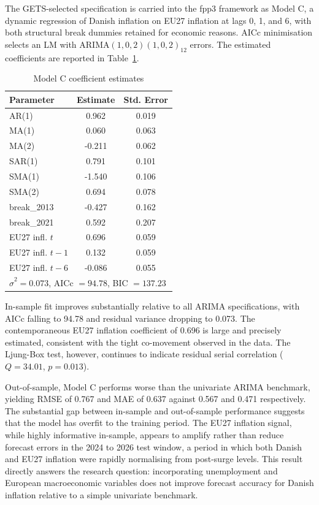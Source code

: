 The GETS-selected specification is carried into the fpp3 framework as Model C, 
a dynamic regression of Danish inflation on EU27 inflation at lags 0, 1, and 6, 
with both structural break dummies retained for economic reasons. AICc 
minimisation selects an LM with ARIMA$(1,0,2)(1,0,2)_{12}$ errors. The 
estimated coefficients are reported in Table~\ref{tab:modelC_coef}.

\begin{table}[H]
\centering
\caption{Model C coefficient estimates}
\begin{tabular}{lcc}
\hline
Parameter & Estimate & Std. Error \\
\hline
AR(1)         &  0.962 & 0.019 \\
MA(1)         &  0.060 & 0.063 \\
MA(2)         & -0.211 & 0.062 \\
SAR(1)        &  0.791 & 0.101 \\
SMA(1)        & -1.540 & 0.106 \\
SMA(2)        &  0.694 & 0.078 \\
break\_2013   & -0.427 & 0.162 \\
break\_2021   &  0.592 & 0.207 \\
EU27 infl. $t$     &  0.696 & 0.059 \\
EU27 infl. $t-1$   &  0.132 & 0.059 \\
EU27 infl. $t-6$   & -0.086 & 0.055 \\
\hline
\multicolumn{3}{l}{$\hat{\sigma}^2 = 0.073$, AICc $= 94.78$, BIC $= 137.23$} \\
\hline
\end{tabular}
\label{tab:modelC_coef}
\end{table}

In-sample fit improves substantially relative to all ARIMA specifications, with 
AICc falling to 94.78 and residual variance dropping to 0.073. The contemporaneous 
EU27 inflation coefficient of 0.696 is large and precisely estimated, consistent 
with the tight co-movement observed in the data. The Ljung-Box test, however, 
continues to indicate residual serial correlation ($Q = 34.01$, $p = 0.013$).

Out-of-sample, Model C performs worse than the univariate ARIMA benchmark, 
yielding RMSE of 0.767 and MAE of 0.637 against 0.567 and 0.471 respectively. 
The substantial gap between in-sample and out-of-sample performance suggests 
that the model has overfit to the training period. The EU27 inflation signal, 
while highly informative in-sample, appears to amplify rather than reduce 
forecast errors in the 2024 to 2026 test window, a period in which both 
Danish and EU27 inflation were rapidly normalising from post-surge levels. 
This result directly answers the research question: incorporating unemployment 
and European macroeconomic variables does not improve forecast accuracy for 
Danish inflation relative to a simple univariate benchmark.

